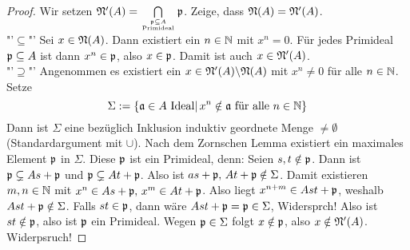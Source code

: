 \begin{proof}
	Wir setzen $\mathfrak{N}'(A)= \bigcap\limits_{\mathfrak{p} \subseteq A\atop \text{Primideal}} \mathfrak{p}$. Zeige, dass $\mathfrak{N}(A) = \mathfrak{N}'(A)$.\\
	"'$\subseteq$"' Sei $x\in \mathfrak{N}(A)$. Dann existiert ein $n\in \mathbb{N}$ mit $x^n=0$. Für jedes Primideal $\mathfrak{p}\subseteq A$ ist dann $x^n\in \mathfrak{p}$, also $x\in \mathfrak{p}$. Damit ist auch $x\in \mathfrak{N}'(A)$.\\
	"'$\supseteq$"' Angenommen es existiert ein $x\in \mathfrak{N}'(A) \backslash \mathfrak{N}(A)$ mit $x^n\neq 0$ für alle $n\in \mathbb{N}$. Setze
	$$\Sigma:= \{\mathfrak{a}\in A \text{ Ideal}|\, x^n\notin \mathfrak{a} \text{ für alle }n\in \mathbb{N}\}$$
	Dann ist $\Sigma$ eine bezüglich Inklusion induktiv geordnete Menge $\neq \emptyset$ (Standardargument mit $\cup$). Nach dem Zornschen Lemma existiert ein maximales Element $\mathfrak{p}$ in $\Sigma$. Diese $\mathfrak{p}$ ist ein Primideal, denn: Seien $s,t\notin \mathfrak{p}$. Dann ist $\mathfrak{p} \subsetneq As+ \mathfrak{p}$ und $\mathfrak{p}\subsetneq At+\mathfrak{p}$. Also ist $as+ \mathfrak{p}, \, At + \mathfrak{p} \notin\Sigma$. Damit existieren $m,n\in \mathbb{N}$ mit $x^n\in As+\mathfrak{p}, \, x^m \in At+ \mathfrak{p}$. Also liegt $x^{n+m} \in Ast+ \mathfrak{p}$, weshalb $Ast + \mathfrak{p} \notin\Sigma$. Falls $st \in \mathfrak{p}$, dann wäre $Ast + \mathfrak{p} = \mathfrak{p} \in \Sigma$, Widersprch! Also ist $st \notin \mathfrak{p}$, also ist $\mathfrak{p}$ ein Primideal. Wegen $\mathfrak{p} \in \Sigma$ folgt $x\notin \mathfrak{p}$, also $x\notin \mathfrak{N}'(A)$. Widerpsruch!
\end{proof}
